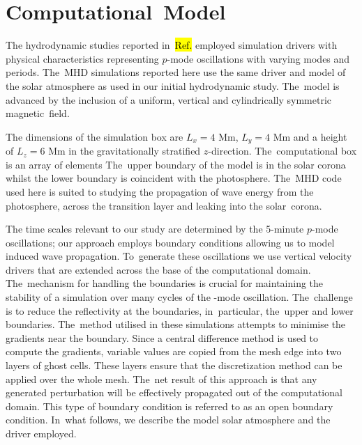 \documentclass[physics,article,accept,pdftex,moreauthors]{Definitions/mdpi}
\begin{document}
\section{Computational~Model}
The hydrodynamic studies reported in~\hl{Ref.} 
\cite{Griffiths2018b} employed simulation drivers with physical characteristics representing $p$-mode oscillations with varying modes and periods. The~MHD simulations reported here use the same driver and model of the solar atmosphere as used in our initial hydrodynamic study. The~model is  advanced by the inclusion of a uniform, vertical and cylindrically symmetric magnetic~field. 

 The dimensions of the simulation box are $L_{ x}= 4$ Mm,  $L_{y} =4$ Mm and a height of $L_{z} =6$ Mm in the gravitationally stratified $z$-direction. The~computational box is an array of elements 
The~upper boundary of the model is in the solar corona whilst the lower boundary is coincident with the photosphere. The~MHD code used here is suited to studying the propagation of wave energy from the photosphere, across the transition layer and leaking into the solar~corona. 
 
The time scales relevant to our study are determined by the 5-minute $p$-mode oscillations; our approach employs boundary conditions allowing us to model induced wave propagation. To~generate these oscillations we use vertical velocity drivers  that are extended across the base of the computational domain. The~mechanism for handling the boundaries is crucial for maintaining the stability of a simulation over many cycles of the 
-mode 
oscillation. The~challenge is to reduce the reflectivity at the boundaries, in~particular, the~upper and lower boundaries. The~method utilised in these simulations attempts to minimise the gradients near the boundary. Since a central difference method is used to compute the gradients, variable values are copied from the mesh edge into two layers of ghost cells. These layers ensure that the discretization method can be applied over the whole mesh. The~net result of this approach is that any generated perturbation will be effectively propagated out of the computational domain. This type of boundary condition is referred to as an open boundary condition. In~what follows, we describe the model solar atmosphere and the driver employed.
\end{document}
